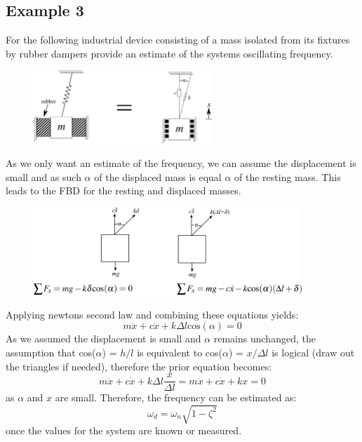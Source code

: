 \documentclass[12pt,a4paper]{article}
\begin{document}
		\subsection*{Example 3} 
			For the following industrial device consisting of a mass isolated from its fixtures by rubber dampers provide an estimate of the systems oscillating frequency.		
			\begin{figure}[H]
				\centering
				\includegraphics[width=0.6\textwidth]{../../Figures/rubber_mounted_mass.png}
			\end{figure}
			As we only want an estimate of the frequency, we can assume the displacement is small and as such $\alpha$ of the displaced mass is equal $\alpha$ of the resting mass. This leads to the FBD for the resting and displaced masses.
			\begin{figure}[H]
				\centering
				\includegraphics[width=0.9\textwidth]{../../Figures/rubber_mounted_mass_FBD.png}
			\end{figure}
			Applying newtons second law and combining these equations yields:
			\begin{equation}
				m\ddot{x} + c\dot{x} + k \Delta l \text{cos}(\alpha) =0
			\end{equation}			
			As we assumed the displacement is small and $\alpha$ remains unchanged, the assumption that cos($\alpha$) = $h/l$ is equivalent to cos($\alpha$) = $x/\Delta l$ is logical (draw out the triangles if needed), therefore the prior equation becomes: 
			\begin{equation}
				m\ddot{x} + c\dot{x} + k \Delta l \frac{x}{\Delta l} =m\ddot{x} + c\dot{x} + k x  = 0
			\end{equation}	
			as $\alpha$ and $x$ are small. Therefore, the frequency can be estimated as:		
			\begin{equation}
				\omega_d = \omega_n\sqrt{1-\zeta^2}
			\end{equation}
			once the values for the system are known or measured. 			
			
\end{document}
